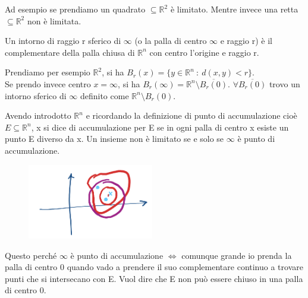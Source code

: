\begin{example}
Ad esempio se prendiamo un quadrato $\subseteq \mathbb{R}^2$ è limitato. Mentre invece una retta $\subseteq \mathbb{R}^2$ non è limitata.
\end{example}

\begin{definition}[Intorno]
Un intorno di raggio r sferico di $\infty$ (o la palla di centro $\infty$ e raggio r) è il complementare della palla chiusa di $\mathbb{R}^n$ con centro l'origine e raggio r.
\end{definition}

\begin{example}
Prendiamo per esempio $\mathbb{R}^2$, si ha $B_r(x) = \{y \in \mathbb{R}^n \::\: d(x,y)<r\}$.\\
Se prendo invece centro $x = \infty$, si ha $B_r(\infty) = \mathbb{R}^n \setminus \overline{B_r(0)}$. $\forall \overline{B_r(0)}$ trovo un intorno sferico di $\infty$ definito come $\mathbb{R}^n \setminus B_r(0)$.
\end{example}

\begin{observation}
Avendo introdotto $\mathbb{R}^n$ e ricordando la definizione di punto di accumulazione cioè $E \subseteq \mathbb{R}^n$, x si dice di accumulazione per E se in ogni palla di centro x esiste un punto E diverso da x. Un insieme non è limitato se e solo se $\infty$ è punto di accumulazione.
\end{observation}
\begin{figure}
    \vspace{-25pt}
    \centering
    \includegraphics[width=5.5cm]{images/oss-punto-accumulo.png}
\end{figure}
Questo perché $\infty$ è punto di accumulazione $\Longleftrightarrow$ comunque grande io prenda la palla di centro 0 quando vado a prendere il suo complementare continuo a trovare punti che si intersecano con E. Vuol dire che E non può essere chiuso in una palla di centro 0.

